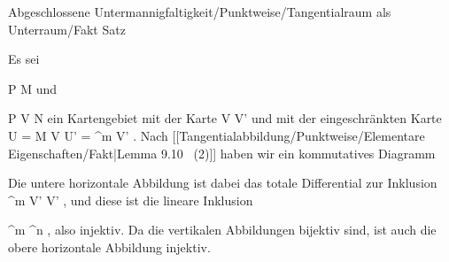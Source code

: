 {Abgeschlossene Untermannigfaltigkeit/Punktweise/Tangentialraum als Unterraum/Fakt}
{Satz}
{}
{

\faktzusatz {}

}
{

Es sei

\mavergleichskette
{\vergleichskette
{ P
}
{ \in }{ M
}
{  }{
}
{    }{
}
{   }{
}
}
{}{}{}
und

\mavergleichskette
{\vergleichskette
{ P
}
{ \in }{ V
}
{ \subseteq }{ N
}
{    }{
}
{   }{
}
}
{}{}{}
ein Kartengebiet mit der Karte
\maabbdisp {\alpha} { V } { V'
} {}
und mit der eingeschränkten Karte
\maabbdisp {} {U = M \cap  V } { U' = \R^m \cap  V'
} {.}
Nach
[[Tangentialabbildung/Punktweise/Elementare Eigenschaften/Fakt|Lemma 9.10  (2)]]
haben wir ein kommutatives Diagramm

 {  }

Die untere horizontale Abbildung ist dabei das totale Differential zur Inklusion
\maabb {} { \R^m \cap  V' } { V'
} {,}
und diese ist die lineare Inklusion

\mavergleichskette
{\vergleichskette
{ \R^m
}
{ \subseteq }{\R^n
}
{  }{
}
{    }{
}
{   }{
}
}
{}{}{,}
also injektiv. Da die vertikalen Abbildungen bijektiv sind, ist auch die obere horizontale Abbildung injektiv.

}

